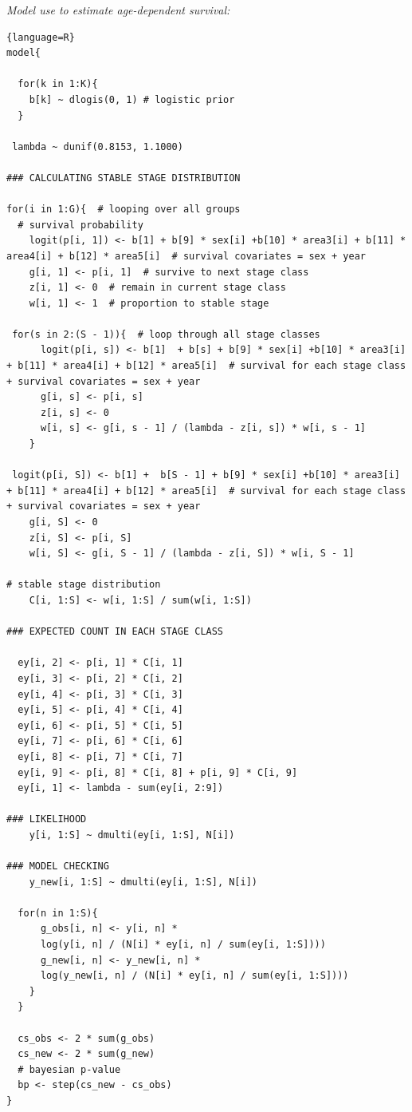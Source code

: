 \documentclass[12pt, a4paper]{article}
\begin{document}
\emph{Model use to estimate age-dependent survival:} \label{app:brood}
\begin{lstlisting}{language=R}
model{
 
  for(k in 1:K){
    b[k] ~ dlogis(0, 1) # logistic prior
  }
 
 lambda ~ dunif(0.8153, 1.1000) 
  
### CALCULATING STABLE STAGE DISTRIBUTION

for(i in 1:G){  # looping over all groups
  # survival probability
    logit(p[i, 1]) <- b[1] + b[9] * sex[i] +b[10] * area3[i] + b[11] * area4[i] + b[12] * area5[i]  # survival covariates = sex + year
    g[i, 1] <- p[i, 1]  # survive to next stage class
    z[i, 1] <- 0  # remain in current stage class
    w[i, 1] <- 1  # proportion to stable stage
    
 for(s in 2:(S - 1)){  # loop through all stage classes
      logit(p[i, s]) <- b[1]  + b[s] + b[9] * sex[i] +b[10] * area3[i] + b[11] * area4[i] + b[12] * area5[i]  # survival for each stage class + survival covariates = sex + year
      g[i, s] <- p[i, s]
      z[i, s] <- 0
      w[i, s] <- g[i, s - 1] / (lambda - z[i, s]) * w[i, s - 1]
    }
    
 logit(p[i, S]) <- b[1] +  b[S - 1] + b[9] * sex[i] +b[10] * area3[i] + b[11] * area4[i] + b[12] * area5[i]  # survival for each stage class + survival covariates = sex + year
    g[i, S] <- 0
    z[i, S] <- p[i, S]
    w[i, S] <- g[i, S - 1] / (lambda - z[i, S]) * w[i, S - 1]
    
# stable stage distribution
    C[i, 1:S] <- w[i, 1:S] / sum(w[i, 1:S])
    
### EXPECTED COUNT IN EACH STAGE CLASS

  ey[i, 2] <- p[i, 1] * C[i, 1]
  ey[i, 3] <- p[i, 2] * C[i, 2]
  ey[i, 4] <- p[i, 3] * C[i, 3]
  ey[i, 5] <- p[i, 4] * C[i, 4]
  ey[i, 6] <- p[i, 5] * C[i, 5]
  ey[i, 7] <- p[i, 6] * C[i, 6]
  ey[i, 8] <- p[i, 7] * C[i, 7]
  ey[i, 9] <- p[i, 8] * C[i, 8] + p[i, 9] * C[i, 9]
  ey[i, 1] <- lambda - sum(ey[i, 2:9])
    
### LIKELIHOOD
    y[i, 1:S] ~ dmulti(ey[i, 1:S], N[i])

### MODEL CHECKING
    y_new[i, 1:S] ~ dmulti(ey[i, 1:S], N[i])
    
  for(n in 1:S){
      g_obs[i, n] <- y[i, n] *
      log(y[i, n] / (N[i] * ey[i, n] / sum(ey[i, 1:S])))
      g_new[i, n] <- y_new[i, n] *
      log(y_new[i, n] / (N[i] * ey[i, n] / sum(ey[i, 1:S])))
    }
  }
  
  cs_obs <- 2 * sum(g_obs)
  cs_new <- 2 * sum(g_new)
  # bayesian p-value
  bp <- step(cs_new - cs_obs)  
}
\end{lstlisting}
\end{document}
